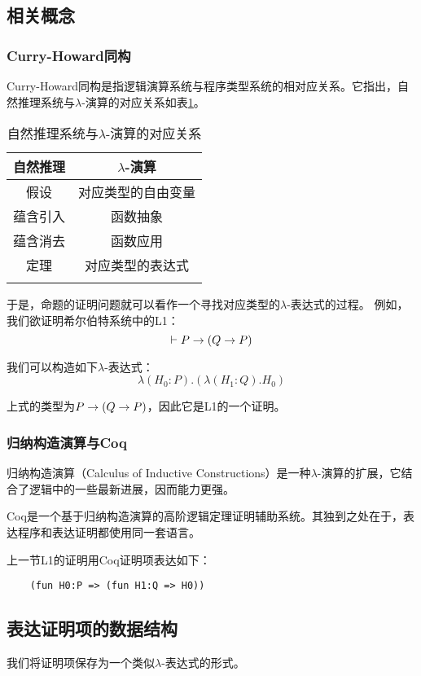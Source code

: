 \subsection{相关概念}
\subsubsection{Curry-Howard同构}
Curry-Howard同构\cite{HowardWA:fortnc}是指逻辑演算系统与程序类型系统的相对应关系。它指出，自然推理系统与$\lambda$-演算的对应关系如表\ref{tab:curry}。
\begin{table}[!ht]
  \label{tab:curry}
  \caption{自然推理系统与$\lambda$-演算的对应关系}
  \centering
  \begin{tabular}{cc}
    \whline
    自然推理 & $\lambda$-演算 \\
    \hline
    假设 & 对应类型的自由变量 \\
    蕴含引入 & 函数抽象 \\
    蕴含消去 & 函数应用 \\
    定理 & 对应类型的表达式 \\
    \whline
  \end{tabular}
\end{table}

于是，命题的证明问题就可以看作一个寻找对应类型的$\lambda$-表达式的过程。
例如，我们欲证明希尔伯特系统中的L1：
$$ \vdash P \rightarrow (Q \rightarrow P) $$

我们可以构造如下$\lambda$-表达式：
$$\lambda (H_0: P).(\lambda (H_1: Q).H_0)$$

上式的类型为$P \rightarrow (Q \rightarrow P) $，因此它是L1的一个证明。

\subsubsection{归纳构造演算与Coq}
归纳构造演算（Calculus of Inductive Constructions）是一种$\lambda$-演算的扩展，它结合了逻辑中的一些最新进展，因而能力更强。

Coq\cite{coq}是一个基于归纳构造演算的高阶逻辑定理证明辅助系统。其独到之处在于，表达程序和表达证明都使用同一套语言。

上一节L1的证明用Coq证明项表达如下：
\begin{verbatim}
    (fun H0:P => (fun H1:Q => H0))
\end{verbatim}

\subsection{表达证明项的数据结构}
我们将证明项保存为一个类似$\lambda$-表达式的形式。

